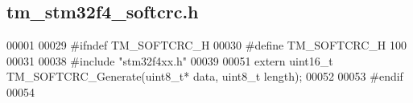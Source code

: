 \hypertarget{tm__stm32f4__softcrc_8h_source}{}\subsection{tm\+\_\+stm32f4\+\_\+softcrc.\+h}

\begin{DoxyCode}
00001 
00029 \textcolor{preprocessor}{#ifndef TM\_SOFTCRC\_H}
00030 \textcolor{preprocessor}{#define TM\_SOFTCRC\_H 100}
00031 
00038 \textcolor{preprocessor}{#include "stm32f4xx.h"}
00039 
00051 \textcolor{keyword}{extern} uint16\_t TM\_SOFTCRC\_Generate(uint8\_t* data, uint8\_t length);
00052 
00053 \textcolor{preprocessor}{#endif}
00054 
\end{DoxyCode}
